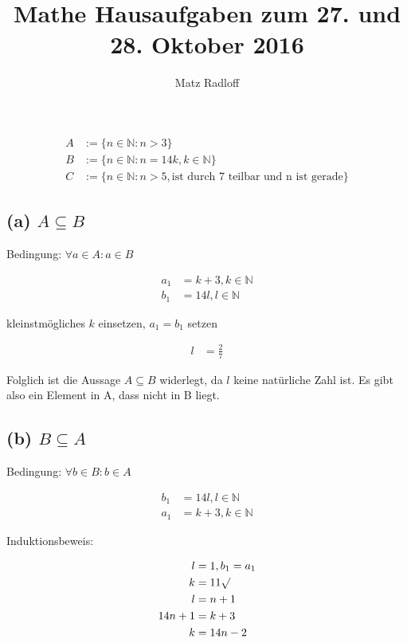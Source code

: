 \documentclass{article}
\title{\textbf{Mathe Hausaufgaben zum 27. und 28. Oktober 2016}}
\author{Matz Radloff}
\begin{document}
  \maketitle
  \date{}
  \tableofcontents
  \newpage
\section{}

\begin{align}
A &:= \{n \in \mathbb{N} : n > 3\}\\
B &:= \{n \in \mathbb{N} : n = 14k, k \in \mathbb{N}\}\\
C &:= \{n \in \mathbb{N} : n > 5, \mbox{ist durch 7 teilbar und n ist gerade}\}
\end{align}

\subsection[(a)]{(a) $A \subseteq B$}

Bedingung: $\forall a \in A : a \in B$

\begin{align}
a_{1} &= k+3, k \in \mathbb{N}\\
b_{1} &= 14l, l \in \mathbb{N}
\end{align}

kleinstmögliches $k$ einsetzen, $a_{1} = b_{1}$ setzen

\begin{align}
l &= \frac{2}{7}
\end{align}

Folglich ist die Aussage $A \subseteq B$ widerlegt, da $l$ keine natürliche Zahl ist. Es gibt also ein Element in A, dass nicht in B liegt.

\subsection[(b)]{(b) $B \subseteq A$}

Bedingung: $\forall b \in B : b \in A$

\begin{align}
b_{1} &= 14l, l \in \mathbb{N}\\
a_{1} &= k+3, k \in \mathbb{N}
\end{align}

Induktionsbeweis:

\begin{align}
l &= 1, b_{1} = a_{1}\\
k &= 11 \surd\\
l &= n+1\\
14n+1 &= k+3\\
k &= 14n-2
\end{align}
\end{document}
